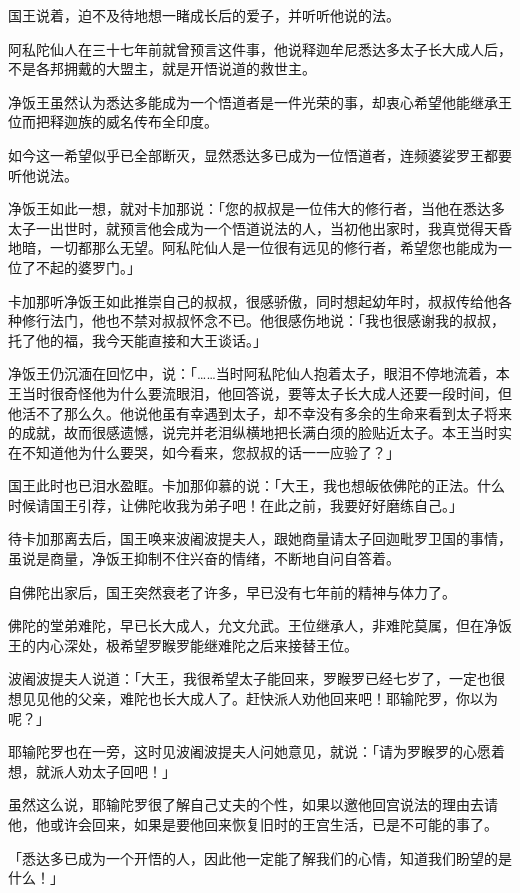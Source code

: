 \documentclass[12pt,twoside,openany]{book}
\begin{document}
国王说着，迫不及待地想一睹成长后的爱子，并听听他说的法。

阿私陀仙人在三十七年前就曾预言这件事，他说释迦牟尼悉达多太子长大成人后，不是各邦拥戴的大盟主，就是开悟说道的救世主。

净饭王虽然认为悉达多能成为一个悟道者是一件光荣的事，却衷心希望他能继承王位而把释迦族的威名传布全印度。

如今这一希望似乎已全部断灭，显然悉达多已成为一位悟道者，连频婆娑罗王都要听他说法。

净饭王如此一想，就对卡加那说：「您的叔叔是一位伟大的修行者，当他在悉达多太子一出世时，就预言他会成为一个悟道说法的人，当初他出家时，我真觉得天昏地暗，一切都那么无望。阿私陀仙人是一位很有远见的修行者，希望您也能成为一位了不起的婆罗门。」

卡加那听净饭王如此推崇自己的叔叔，很感骄傲，同时想起幼年时，叔叔传给他各种修行法门，他也不禁对叔叔怀念不已。他很感伤地说：「我也很感谢我的叔叔，托了他的福，我今天能直接和大王谈话。」

净饭王仍沉湎在回忆中，说：「……当时阿私陀仙人抱着太子，眼泪不停地流着，本王当时很奇怪他为什么要流眼泪，他回答说，要等太子长大成人还要一段时间，但他活不了那么久。他说他虽有幸遇到太子，却不幸没有多余的生命来看到太子将来的成就，故而很感遗憾，说完并老泪纵横地把长满白须的脸贴近太子。本王当时实在不知道他为什么要哭，如今看来，您叔叔的话一一应验了？」

国王此时也已泪水盈眶。卡加那仰慕的说：「大王，我也想皈依佛陀的正法。什么时候请国王引荐，让佛陀收我为弟子吧！在此之前，我要好好磨练自己。」

待卡加那离去后，国王唤来波阇波提夫人，跟她商量请太子回迦毗罗卫国的事情，虽说是商量，净饭王抑制不住兴奋的情绪，不断地自问自答着。

自佛陀出家后，国王突然衰老了许多，早已没有七年前的精神与体力了。

佛陀的堂弟难陀，早已长大成人，允文允武。王位继承人，非难陀莫属，但在净饭王的内心深处，极希望罗睺罗能继难陀之后来接替王位。

波阇波提夫人说道：「大王，我很希望太子能回来，罗睺罗已经七岁了，一定也很想见见他的父亲，难陀也长大成人了。赶快派人劝他回来吧！耶输陀罗，你以为呢？」

耶输陀罗也在一旁，这时见波阇波提夫人问她意见，就说：「请为罗睺罗的心愿着想，就派人劝太子回吧！」

虽然这么说，耶输陀罗很了解自己丈夫的个性，如果以邀他回宫说法的理由去请他，他或许会回来，如果是要他回来恢复旧时的王宫生活，已是不可能的事了。

「悉达多已成为一个开悟的人，因此他一定能了解我们的心情，知道我们盼望的是什么！」
\end{document}
